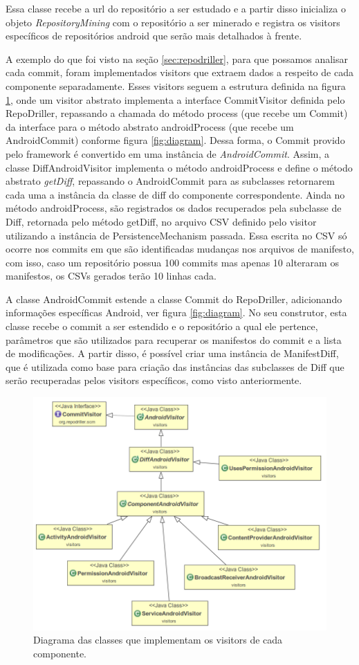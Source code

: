 \documentclass[a4paper,12pt]{article}
\begin{document}
Essa classe recebe a url do repositório a ser estudado e a partir disso inicializa o objeto \textit{RepositoryMining} com o repositório a ser minerado e registra os visitors específicos de repositórios android que serão mais detalhados à frente.


A exemplo do que foi visto na seção \ref{sec:repodriller}, para que possamos analisar cada commit, foram implementados visitors que extraem dados a respeito de cada componente separadamente. Esses visitors seguem a estrutura definida na figura \ref{fig:visitors}, onde um visitor abstrato implementa a interface CommitVisitor definida pelo RepoDriller, repassando a chamada do método process (que recebe um Commit) da interface para o método abstrato androidProcess (que recebe um AndroidCommit) conforme figura \ref{fig:diagram}. Dessa forma, o Commit provido pelo framework é convertido em uma instância de \textit{AndroidCommit}. Assim, a classe DiffAndroidVisitor implementa o método androidProcess e define o método abstrato \textit{getDiff}, repassando o AndroidCommit para as subclasses retornarem cada uma a instância da classe de diff do componente correspondente. Ainda no método androidProcess, são registrados os dados recuperados pela subclasse de Diff, retornada pelo método getDiff, no arquivo CSV definido pelo visitor utilizando a instância de PersistenceMechanism passada. Essa escrita no CSV só ocorre nos commits em que são identificadas mudanças nos arquivos de manifesto, com isso, caso um repositório possua 100 commits mas apenas 10  alteraram os manifestos, os CSVs gerados terão 10 linhas cada.

A classe AndroidCommit estende a classe Commit do RepoDriller, adicionando informações específicas Android, ver figura \ref{fig:diagram}. No seu construtor, esta classe recebe o commit a ser estendido e o repositório a qual ele pertence, parâmetros que são utilizados para recuperar os manifestos do commit e a lista de modificações. A partir disso, é possível criar uma instância de ManifestDiff, que é utilizada como base para criação das instâncias das subclasses de Diff que serão recuperadas pelos visitors específicos, como visto anteriormente.


\begin{figure}[h]
\centering
\includegraphics[width=0.8\linewidth]{imgs/visitors.png}
\caption{Diagrama das classes que implementam os visitors de cada componente.}
\label{fig:visitors}
\end{figure}
\end{document}
